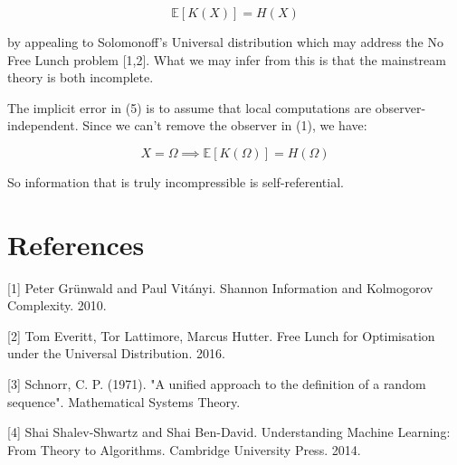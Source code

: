 \documentclass{article}
\begin{document}
\begin{equation}
\mathbb{E}[K(X)] = H(X)
\end{equation}

by appealing to Solomonoff's Universal distribution which may address the No Free Lunch problem [1,2]. What we may infer from this is that the mainstream theory is both incomplete. 

The implicit error in (5) is to assume that local computations are observer-independent. Since we can't remove the observer in (1),
we have:

\begin{equation}
X = \Omega \implies \mathbb{E}[K(\Omega)] = H(\Omega)
\end{equation}

So information that is truly incompressible is self-referential.

\section*{References}

\small
[1] Peter Grünwald and Paul Vitányi. Shannon Information and Kolmogorov Complexity. 2010.

[2] Tom Everitt, Tor Lattimore, Marcus Hutter. Free Lunch for Optimisation under the Universal Distribution. 2016.

[3] Schnorr, C. P. (1971). "A unified approach to the definition of a random sequence". Mathematical Systems Theory.

[4] Shai Shalev-Shwartz and Shai Ben-David. Understanding Machine Learning: From Theory to Algorithms. Cambridge University Press. 2014. 
\end{document}
